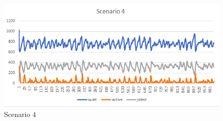 \begin{figure}[h!]
        \includegraphics[width=\linewidth]{Scenario_4.png}
        \caption{Scenario 4}
        \label{fig:scenario}
      \end{figure}